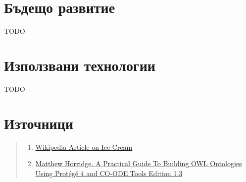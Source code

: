 \documentclass[12pt]{article}
\begin{document}
\section{Бъдещо развитие}

TODO




\section{Използвани технологии}

TODO







\listoffigures

\section{Източници}

\begin{quote}

    \begin{enumerate}
    
    \item \href{https://en.wikipedia.org/wiki/Ice_cream}{Wikipedia Article on Ice Cream}
    
    \item \href{https://www.researchgate.net/publication/272829948_A_Practical_Guide_To_Building_OWL_Ontologies_Using_Protege_4_and_CO-ODE_Tools_Edition_13}{Matthew Horridge. A Practical Guide To Building OWL Ontologies Using Protégé 4 and CO-ODE Tools Edition 1.3}

    
    
    \end{enumerate}

\end{quote}
\end{document}
